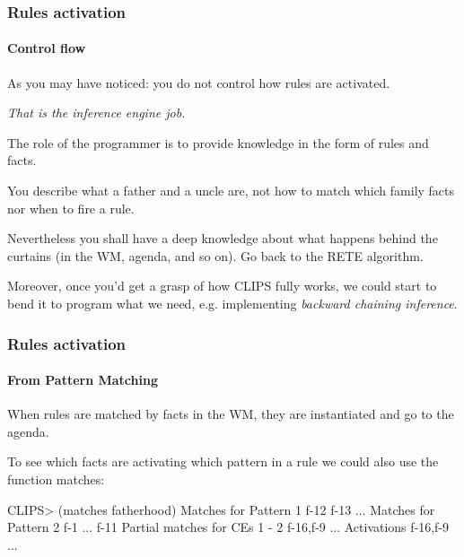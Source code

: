 \documentclass[xcolor={usenames,dvipsnames,svgnames}, compress]{beamer}
\begin{document}




\begin{frame}
  \frametitle{Rules activation}
  \framesubtitle{Control flow}
  As you may have noticed: you do not control how rules are
  activated.\par
  \begin{center}
    \emph{That is the inference engine job.}
  \end{center}
  The role of the programmer is to provide knowledge in the form of
  rules and facts.\bigskip

  You describe what a father and a uncle are, not how to match which
  family facts nor when to fire a rule.

  Nevertheless you shall have a deep knowledge about what happens
  behind the curtains (in the WM, agenda, and so on). Go back to the
  RETE algorithm.\par\bigskip

  Moreover, once you'd get a grasp of how CLIPS fully works, we could
  start to bend it to program what we need, e.g. implementing \emph{backward chaining inference}.
\end{frame}

\begin{frame}[fragile]
  \frametitle{Rules activation}
  \framesubtitle{From Pattern Matching}
  When rules are matched by facts in the WM, they are instantiated and
  go to the agenda.\par\bigskip

  To see which facts are activating which pattern in a rule we could also use the
  function \textsf{matches}:
  \begin{clips-code}
    CLIPS> (matches fatherhood)
    Matches for Pattern 1
    f-12
    f-13
    ...
    Matches for Pattern 2
    f-1
    ...
    f-11
    Partial matches for CEs 1 - 2
    f-16,f-9
    ...
    Activations
    f-16,f-9
    ...
  \end{clips-code}
\end{frame}
\end{document}
